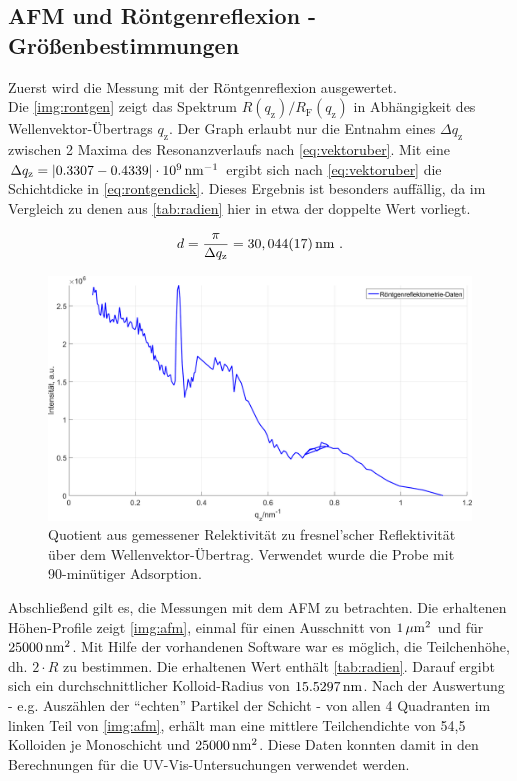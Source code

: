 \documentclass[numbers=noenddot,a4paper,notitlepage,twoside,BCOR15mm]{scrartcl}
\newcommand{\tenpo}[1]{ 10^{#1}}
\newcommand{\ix}[1]{_\text{#1}}
\begin{document}
		\subsection{AFM und Röntgenreflexion - Größenbestimmungen}\label{subsec:auswerafm}

			Zuerst wird die Messung mit der Röntgenreflexion ausgewertet.\\
			Die \autoref{img:rontgen} zeigt das Spektrum $R(q\ix{z})/R\ix{F}(q\ix{z})$ in Abhängigkeit des Wellenvektor-Übertrags $q\ix{z}$. Der Graph erlaubt nur die Entnahm eines $\Delta q\ix{z}$ zwischen 2 Maxima des Resonanzverlaufs nach \autoref{eq:vektoruber}. Mit eine $\Delta q\ix{z}= |0.3307-0.4339|\cdot\unit[\tenpo{9}]{nm^{-1}}$ ergibt sich nach \autoref{eq:vektoruber} die Schichtdicke in \autoref{eq:rontgendick}. Dieses Ergebnis ist besonders auffällig, da im Vergleich zu denen aus \autoref{tab:radien} hier in etwa der doppelte Wert vorliegt.

				\begin{align}
					d=\frac{\pi}{\Delta q\ix{z}}=\unit[30,044(17)]{nm} \,\,.
				\end{align}

				\begin{figure}[H]
					\centering
					\includegraphics[width=\textwidth]{rontgenreflexion.png}
					\caption{Quotient aus gemessener Relektivität zu fresnel'scher Reflektivität über dem Wellenvektor-Übertrag.  Verwendet wurde die Probe mit 90-minütiger Adsorption.}
					\label{img:rontgen}
				\end{figure}

			Abschließend gilt es, die Messungen mit dem AFM zu betrachten. Die erhaltenen Höhen-Profile zeigt \autoref{img:afm}, einmal für einen Ausschnitt von $\unit[1]{\mu m^2}$ und für $\unit[25000]{nm^2}$. Mit Hilfe der vorhandenen Software war es möglich, die Teilchenhöhe, dh. $2\cdot R$ zu bestimmen. Die erhaltenen Wert enthält \autoref{tab:radien}. Darauf ergibt sich ein durchschnittlicher Kolloid-Radius von $\unit[15.5297]{nm}$. Nach der Auswertung - e.g. Auszählen der "`echten"'  Partikel der Schicht - von allen 4 Quadranten im linken Teil von \autoref{img:afm}, erhält man eine mittlere Teilchendichte von 54,5 Kolloiden je Monoschicht und $\unit[25000]{nm^2}$. Diese Daten konnten damit in den Berechnungen für die UV-Vis-Untersuchungen verwendet werden.
\end{document}
